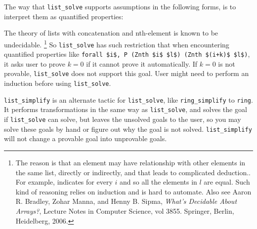 \documentclass[12pt,fleqn,openany,oneside,showtrims]{memoir}
\begin{document}
The way that \lstinline{list_solve} supports assumptions in the following forms,
is to interpret them as quantified properties:

The theory of lists with concatenation and nth-element is known to be undecidable.%
\footnote{The reason is that an element may have relationship with other elements in the same list, directly or indirectly, and that leads to complicated deduction..
For example, 
indicates  for every $i$ and so all the elements in $l$ are equal.
Such kind of reasoning relies on induction and is hard to automate.
Also see Aaron R. Bradley, Zohar Manna, and Henny B. Sipma, \emph{What’s Decidable About Arrays?}, Lecture Notes in Computer Science, vol 3855. Springer, Berlin, Heidelberg, 2006.
}
So \lstinline{list_solve} has such restriction that when
  encountering quantified properties like
  \lstinline{forall $i$, P (Znth $i$ $l$) (Znth $(i+k)$ $l$)},
it asks user to prove $k=0$ if it cannot prove it automatically.
If $k=0$ is not provable, \lstinline{list_solve} does not support this goal.
User might need to perform an induction before using \lstinline{list_solve}.

\lstinline{list_simplify} is an alternate tactic for \lstinline{list_solve}, like \lstinline{ring_simplify} to \lstinline{ring}.
It performs transformations in the same way as \lstinline{list_solve},
  and solves the goal if \lstinline{list_solve} can solve,
  but leaves the unsolved goals to the user,
so you may solve these goals by hand or figure out why the goal is not solved.
\lstinline{list_simplify} will not change a provable goal into unprovable goals.
\end{document}
